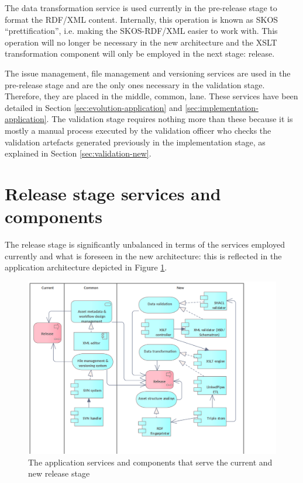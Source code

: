 	The data transformation service is used currently in the pre-release stage to format the RDF/XML content. Internally, this operation is known as SKOS ``prettification'', i.e. making the SKOS-RDF/XML easier to work with. This operation will no longer be necessary in the new architecture and the XSLT transformation component will only be employed in the next stage: release.
	
	The issue management, file management and versioning services are used in the pre-release stage and are the only ones necessary in the validation stage. Therefore, they are placed in the middle, common, lane. These services have been detailed in Section \ref{sec:evolution-application} and \ref{sec:implementation-application}. The validation stage requires nothing more than these because it is mostly a manual process executed by the validation officer who checks the validation artefacts generated previously in the implementation stage, as explained in Section \ref{sec:validation-new}.	

	\section{Release stage services and components}
	\label{sec:release-application}	
	
	The release stage is significantly unbalanced in terms of the services employed currently and what is foreseen in the new architecture: this is reflected in the application architecture depicted in Figure \ref{fig:application-release}. 
	
	\begin{figure}[h]
		\centering
		\includegraphics[width=.9\textwidth]{images/application/Release v3.png}
		\caption{The application services and components that serve the current and new release stage}
		\label{fig:application-release}
	\end{figure}

